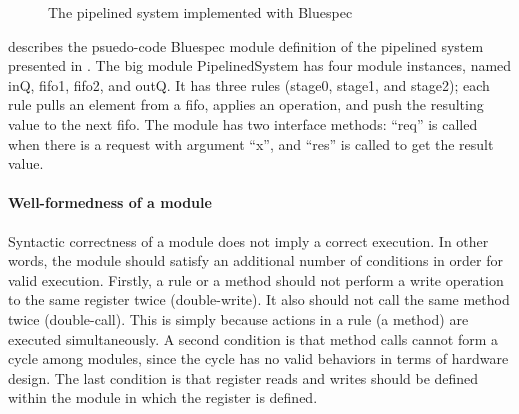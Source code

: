 \begin{figure}[t]
  \caption{The pipelined system implemented with Bluespec}
  \label{ex-pipelined-system-bluespec}
\end{figure}

 describes the psuedo-code
Bluespec module definition of the pipelined system presented in
. The big module PipelinedSystem has four
module instances, named inQ, fifo1, fifo2, and outQ. It has three
rules (stage0, stage1, and stage2); each rule pulls an element from a
fifo, applies an operation, and push the resulting value to the next
fifo. The module has two interface methods: ``req'' is called when
there is a request with argument ``x'', and ``res'' is called to get
the result value.

\paragraph{Well-formedness of a module}

Syntactic correctness of a module does not imply a correct
execution. In other words, the module should satisfy an additional
number of conditions in order for valid execution. Firstly, a rule or
a method should not perform a write operation to the same register
twice (double-write). It also should not call the same method twice
(double-call). This is simply because actions in a rule (a method) are
executed simultaneously. A second condition is that method calls
cannot form a cycle among modules, since the cycle has no valid
behaviors in terms of hardware design. The last condition is that
register reads and writes should be defined within the module in which
the register is defined.

